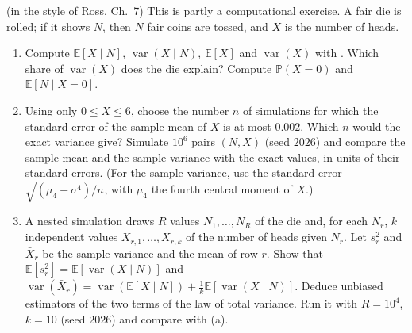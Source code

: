 \begin{exercise}\label{ex:cp-total-variance-simulation}
\medium (in the style of Ross, Ch.~7) This is partly a computational exercise. A fair die is
rolled; if it shows $N$, then $N$ fair coins are tossed, and $X$ is the number of heads.
\begin{enumerate}[label=(\alph*)]
  \item Compute $\mathbb E[X\mid N]$, $\operatorname{var}(X\mid N)$, $\mathbb E[X]$ and
    $\operatorname{var}(X)$ with . Which share of $\operatorname{var}(X)$
    does the die explain? Compute $\mathbb P(X=0)$ and $\mathbb E[N\mid X=0]$.
  \item Using only $0\le X\le6$, choose the number $n$ of simulations for which the standard error of
    the sample mean of $X$ is at most $0.002$. Which $n$ would the exact variance give? Simulate
    $10^6$ pairs $(N,X)$ (seed $2026$) and compare the sample mean and the sample variance with the
    exact values, in units of their standard errors. (For the sample variance, use the standard error
    $\sqrt{(\mu_4-\sigma^4)/n}$, with $\mu_4$ the fourth central moment of $X$.)
  \item A nested simulation draws $R$ values $N_1,\dots,N_R$ of the die and, for each $N_r$, $k$
    independent values $X_{r,1},\dots,X_{r,k}$ of the number of heads given $N_r$. Let $s_r^2$ and
    $\bar X_r$ be the sample variance and the mean of row $r$. Show that
    $\mathbb E[s_r^2]=\mathbb E[\operatorname{var}(X\mid N)]$ and
    $\operatorname{var}(\bar X_r)=\operatorname{var}(\mathbb E[X\mid N])+\frac1k\mathbb E[\operatorname{var}(X\mid N)]$.
    Deduce unbiased estimators of the two terms of the law of total variance. Run it with $R=10^4$,
    $k=10$ (seed $2026$) and compare with (a).
\end{enumerate}
\end{exercise}

